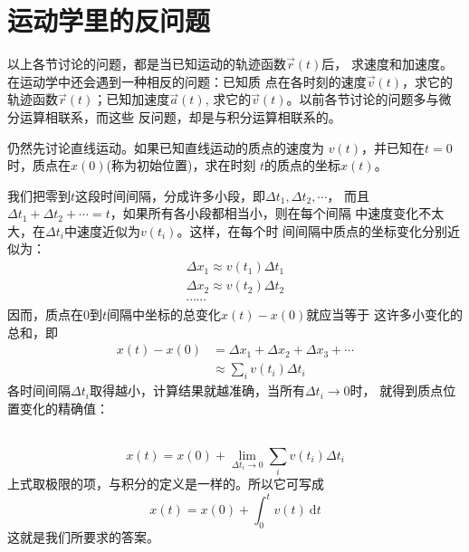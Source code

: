 \documentclass[../outline-of-mechanics.tex]{subfiles}
\begin{document}
\section{运动学里的反问题}\label{sec:01.11}

以上各节讨论的问题，都是当已知运动的轨迹函数$\vec{r}\left(t\right)$后，
求速度和加速度。在运动学中还会遇到一种相反的问题：已知质
点在各时刻的速度$\vec{v}\left(t\right)$，求它的轨迹函数$\vec{r}\left(t\right)$；已知加速度$\vec{a}\left(t\right)$,
求它的$\vec{v}\left(t\right)$。以前各节讨论的问题多与微分运算相联系，而这些
反问题，却是与积分运算相联系的。

仍然先讨论直线运动。如果已知直线运动的质点的速度为
$v\left(t\right)$，并已知在$t=0$时，质点在$x\left(0\right)$(称为初始位置)，求在时刻
$t$的质点的坐标$x\left(t\right)$。

我们把零到$t$这段时间间隔，分成许多小段，即$\Delta t_1 , \Delta t_2 , \cdots$，
而且$\Delta t_1+\Delta t_2+\cdots=t$，如果所有各小段都相当小，则在每个间隔
中速度变化不太大，在$\Delta t_i$中速度近似为$v\left(t_i\right)$。这样，在每个时
间间隔中质点的坐标变化分别近似为：
\begin{equation*}
  \begin{array}{l}
    \Delta x_{1} \approx v\left(t_{1}\right) \Delta t_{1} \\[-1pt]
    \Delta x_{2} \approx v\left(t_{2}\right) \Delta t_{2} \\[-1pt]
    \cdots \cdots
  \end{array}
\end{equation*}
因而，质点在0到$t$间隔中坐标的总变化$x\left(t\right)-x\left(0\right)$就应当等于
这许多小变化的总和，即\vspace{-0.5em}
\begin{equation}\label{eqn:01.11.01}
  \begin{aligned}
    x\left(t\right)-x\left(0\right) & =\Delta x_{1}+\Delta x_{2}+\Delta x_{3}+\cdots    \\[-1pt]
                                    & \approx \sum_{i} v\left(t_{i}\right) \Delta t_{i}
  \end{aligned}
\end{equation}
各时间间隔$\Delta t_i$取得越小，计算结果就越准确，当所有$\Delta t_i\rightarrow 0$时，
就得到质点位置变化的精确值：

~\vspace{-1.56em}
\begin{equation}\label{eqn:01.11.02}
  x\left(t\right)=x\left(0\right)+\lim _{\Delta t_{i} \rightarrow 0} \sum_{i} v\left(t_{i}\right) \Delta t_{i}
\end{equation}
上式取极限的项，与积分的定义是一样的。所以它可写成
\begin{equation}\label{eqn:01.11.03}
  x\left(t\right)=x\left(0\right)+\int_{0}^{t} v\left(t\right) {~\mathrm d} t
\end{equation}
这就是我们所要求的答案。
\end{document}
